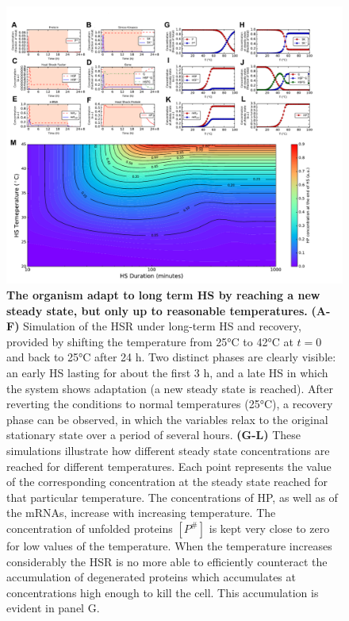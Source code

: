 \documentclass[oneside, 10pt, a4paper, twocolumn]{article}
\begin{document}
\begin{figure}
\centering
\includegraphics[width=\textwidth]{Figure8_SupMat.pdf}
\caption{\small{\textbf{The organism adapt to long term HS by reaching a new steady state, but only up to reasonable temperatures.} \textbf{(A-F)} Simulation of the HSR under long-term HS and recovery, provided by shifting the temperature from 25°C to 42°C at $t=0$ and back to 25°C after 24 h. Two distinct phases are clearly visible: an early HS lasting for about the first $3$ h, and a late HS in which the system shows adaptation (a new steady state is reached). 
After reverting the conditions to normal temperatures (25°C), a recovery phase can be observed, in which
the variables relax to the original stationary state over a period of several hours. \textbf{(G-L)} These simulations illustrate how different steady state concentrations are reached for different temperatures. Each point represents the value of the corresponding concentration at the steady state reached for that particular temperature. The concentrations of HP, as well as of the mRNAs, increase with increasing temperature. The concentration of unfolded proteins $\left[P^\#\right]$ is kept very close to zero for low values of the temperature. When the temperature increases considerably the HSR is no more able to efficiently counteract the accumulation of degenerated proteins which accumulates at concentrations high enough to kill the cell. This accumulation is evident in panel G. 
}}
\end{figure}
\end{document}
